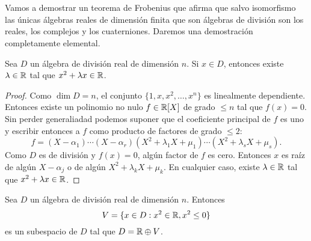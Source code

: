 \chapter{}


Vamos a demostrar un teorema de Frobenius que afirma que salvo isomorfismo las únicas 
álgebras reales de dimensión finita que son álgebras de división son los
reales, los complejos y los cuaterniones. Daremos una demostración
completamente elemental.

\begin{lemma}
	\label{lem:trick_frobenius1}
	Sea $D$ un álgebra de división real de dimensión $n$. Si $x\in D$, entonces
	existe $\lambda\in\mathbb{R}$ tal que $x^2+\lambda x\in\mathbb{R}$.
\end{lemma}

\begin{proof}
	Como $\dim D=n$, el conjunto $\{1,x,x^2,\dots,x^n\}$ es linealmente
	dependiente. Entonces existe un polinomio no nulo $f\in\mathbb{R}[X]$ de grado
	$\leq n$ tal que $f(x)=0$. Sin perder generaliadad podemos suponer que el
	coeficiente principal de $f$ es uno y escribir entonces a $f$ como producto
	de factores de grado $\leq2$:
	\[
		f=(X-\alpha_1)\cdots (X-\alpha_r)(X^2+\lambda_1 X+\mu_1)\cdots (X^2+\lambda_s X+\mu_s).
	\]
	Como $D$ es de división y $f(x)=0$, algún factor de $f$ es cero. Entonces
	$x$ es raíz de algún $X-\alpha_j$ o de algún $X^2+\lambda_k X+\mu_k$. En
	cualquier caso, existe $\lambda\in\mathbb{R}$ tal que $x^2+\lambda x\in\mathbb{R}$. 
\end{proof}

\begin{lemma}
	\label{lem:trick_frobenius2}
	Sea $D$ un álgebra de división real de dimensión $n$. Entonces
	\[
		V=\{x\in D:x^2\in\mathbb{R},x^2\leq 0\}
	\]
	es un subespacio de $D$ tal que $D=\mathbb{R}\oplus V$.
\end{lemma}

